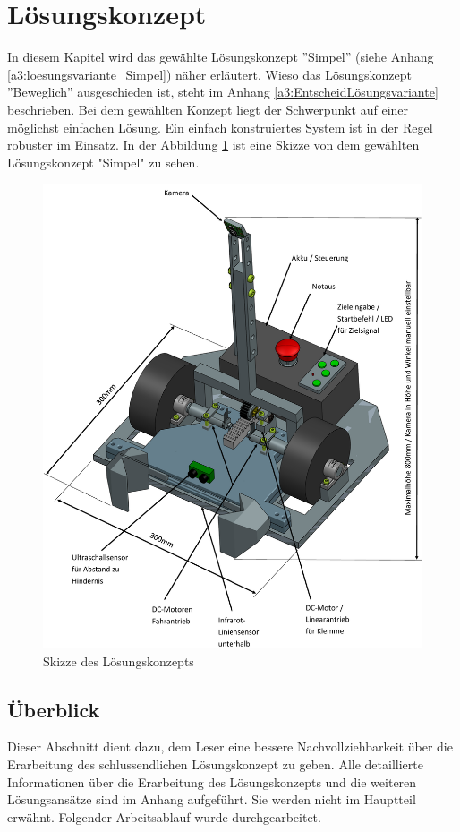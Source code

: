 \documentclass[../main.tex]{subfiles}
\begin{document}
\newpage
\section{Lösungskonzept}\label{lösungskonzept}

In diesem Kapitel wird das gewählte Lösungskonzept ''Simpel'' (siehe Anhang \ref{a3:loesungsvariante_Simpel}) näher erläutert. Wieso das Lösungskonzept ''Beweglich'' ausgeschieden ist, steht im Anhang \ref{a3:EntscheidLösungsvariante} beschrieben. Bei dem gewählten Konzept liegt der Schwerpunkt auf einer möglichst einfachen Lösung. Ein einfach konstruiertes System ist in der Regel robuster im Einsatz. In der Abbildung \ref{img:Konzept-Skizze_Fahrzeug} ist eine Skizze von dem gewählten Lösungskonzept "Simpel" zu sehen.

\begin{figure}[H]
\centering
\includegraphics[width=0.85\linewidth]{Skizze Konzept beschriftet.png}
\caption{Skizze des Lösungskonzepts}
\label{img:Konzept-Skizze_Fahrzeug}
\end{figure}

\newpage
\subsection{Überblick}
Dieser Abschnitt dient dazu, dem Leser eine bessere Nachvollziehbarkeit über die Erarbeitung des schlussendlichen Lösungskonzept zu geben.
Alle detaillierte Informationen über die Erarbeitung des Lösungskonzepts und die weiteren Lösungsansätze sind im Anhang aufgeführt. Sie werden nicht im Hauptteil erwähnt. Folgender Arbeitsablauf wurde durchgearbeitet.
\end{document}

